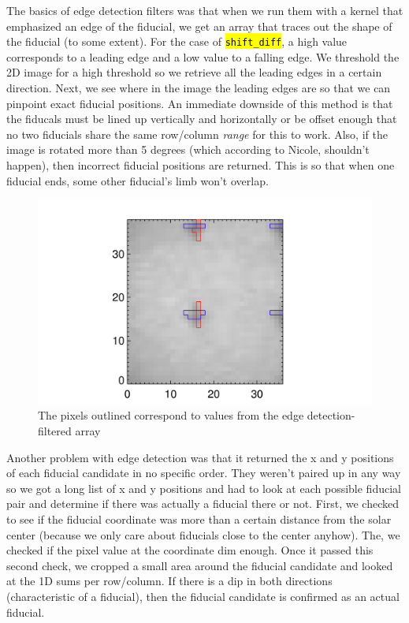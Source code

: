 \documentclass[10pt]{scrartcl}
\begin{document}
The basics of edge detection filters was that when we run them with a kernel that emphasized an edge of the fiducial, we get an array that traces out the shape of the fiducial (to some extent). For the case of \hl{\texttt{shift\_diff}}, a high value corresponds to a leading edge and a low value to a falling edge. We threshold the 2D image for a high threshold so we retrieve all the leading edges in a certain direction. Next, we see where in the image the leading edges are so that we can pinpoint exact fiducial positions. An immediate downside of this method is that the fiducals must be lined up vertically and horizontally or be offset enough that no two fiducials share the same row/column \emph{range} for this to work. Also, if the image is rotated more than 5 degrees (which according to Nicole, shouldn't happen), then incorrect fiducial positions are returned. This is so that when one fiducial ends, some other fiducial's limb won't overlap.

\begin{figure}[!ht]
   \includegraphics[width=.75\textwidth]{../plots_tables_images/threshtesh_3.png}%
   \caption{The pixels outlined correspond to values from the edge detection-filtered array}\label{edge_det}
\end{figure}

Another problem with edge detection was that it returned the x and y positions of each fiducial candidate in no specific order. They weren't paired up in any way so we got a long list of x and y positions and had to look at each possible fiducial pair and determine if there was actually a fiducial there or not. First, we checked to see if the fiducial coordinate was more than a certain distance from the solar center (because we only care about fiducials close to the center anyhow). The, we checked if the pixel value at the coordinate dim enough. Once it passed this second check, we cropped a small area around the fiducial candidate and looked at the 1D sums per row/column. If there is a dip in both directions (characteristic of a fiducial), then the fiducial candidate is confirmed as an actual fiducial.\\
\end{document}

